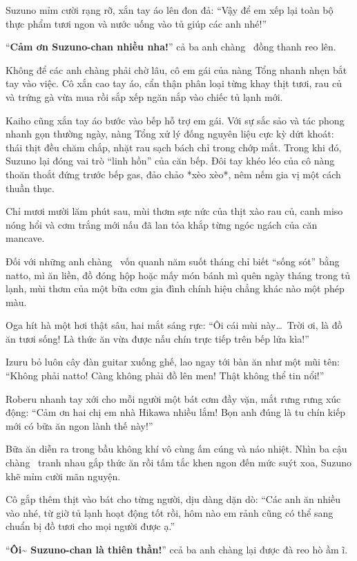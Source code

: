 \documentclass[../main.tex]{subfiles}
\begin{document}
Suzuno mỉm cười rạng rỡ, xắn tay áo lên đon đả: ``Vậy để em xếp lại toàn bộ thực phẩm tươi ngon và nước uống vào tủ giúp các anh nhé!''

``\textbf{Cảm ơn Suzuno-chan nhiều nha!}'' cả ba anh chàng \hls\ đồng thanh reo lên.

Không để các anh chàng phải chờ lâu, cô em gái của nàng Tổng nhanh nhẹn bắt tay vào việc. Cô xắn cao tay áo, cẩn thận phân loại từng khay thịt tươi, rau củ và trứng gà vừa mua rồi sắp xếp ngăn nắp vào chiếc tủ lạnh mới.

Kaiho cũng xắn tay áo bước vào bếp hỗ trợ em gái. Với sự sắc sảo và tác phong nhanh gọn thường ngày, nàng Tổng xử lý đống nguyên liệu cực kỳ dứt khoát: thái thịt đều chăm chắp, nhặt rau sạch bách chỉ trong chớp mắt. Trong khi đó, Suzuno lại đóng vai trò ``linh hồn'' của căn bếp. Đôi tay khéo léo của cô nàng thoăn thoắt đứng trước bếp gas, đảo chảo *xèo xèo*, nêm nếm gia vị một cách thuần thục.

Chỉ mươi mười lăm phút sau, mùi thơm sực nức của thịt xào rau củ, canh miso nóng hổi và cơm trắng mới nấu đã lan tỏa khắp từng ngóc ngách của căn mancave.

Đối với những anh chàng \hls\ vốn quanh năm suốt tháng chỉ biết ``sống sót'' bằng natto, mì ăn liền, đồ đóng hộp hoặc mấy món bánh mì quên ngày tháng trong tủ lạnh, mùi thơm của một bữa cơm gia đình chính hiệu chẳng khác nào một phép màu.

Oga hít hà một hơi thật sâu, hai mắt sáng rực: ``Ôi cái mùi này\dots\ Trời ơi, là đồ ăn tươi sống! Là thức ăn vừa được nấu chín trực tiếp trên bếp lửa kìa!''

Izuru bỏ luôn cây đàn guitar xuống ghế, lao ngay tới bàn ăn như một mũi tên: ``Không phải natto! Càng không phải đồ lên men! Thật không thể tin nổi!''

Roberu nhanh tay xới cho mỗi người một bát cơm đầy vặn, mắt rưng rưng xúc động: ``Cảm ơn hai chị em nhà Hikawa nhiều lắm! Bọn anh đúng là tu chín kiếp mới có bữa ăn ngon lành thế này!''

Bữa ăn diễn ra trong bầu không khí vô cùng ấm cúng và náo nhiệt. Nhìn ba cậu chàng \hls\ tranh nhau gắp thức ăn rồi tấm tắc khen ngon đến mức suýt xoa, Suzuno khẽ mỉm cười mãn nguyện.

Cô gắp thêm thịt vào bát cho từng người, dịu dàng dặn dò: ``Các anh ăn nhiều vào nhé, từ giờ tủ lạnh hoạt động tốt rồi, hôm nào em rảnh cũng có thể sang chuẩn bị đồ tươi cho mọi người được ạ.''

``\textbf{Ôi\~{} Suzuno-chan là thiên thần!}'' ccả ba anh chàng lại được đà reo hò ầm ĩ.
\end{document}

